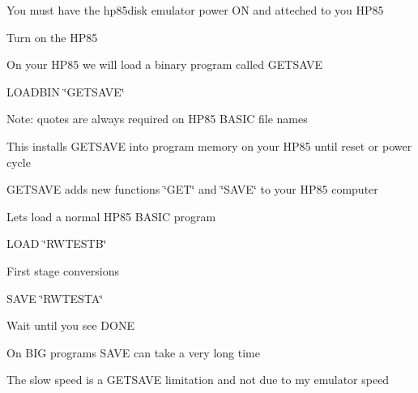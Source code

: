 \begin{DoxyItemize}
\item You must have the hp85disk emulator power ON and atteched to you H\+P85
\begin{DoxyItemize}
\item Turn on the H\+P85
\end{DoxyItemize}
\item On your H\+P85 we will load a binary program called G\+E\+T\+S\+A\+VE
\begin{DoxyItemize}
\item L\+O\+A\+D\+B\+IN \char`\"{}\+G\+E\+T\+S\+A\+V\+E\char`\"{}
\begin{DoxyItemize}
\item Note\+: quotes are always required on H\+P85 B\+A\+S\+IC file names
\item This installs G\+E\+T\+S\+A\+VE into program memory on your H\+P85 until reset or power cycle
\begin{DoxyItemize}
\item G\+E\+T\+S\+A\+VE adds new functions \char`\"{}\+G\+E\+T\char`\"{} and \char`\"{}\+S\+A\+V\+E\char`\"{} to your H\+P85 computer
\end{DoxyItemize}
\end{DoxyItemize}
\end{DoxyItemize}
\item Lets load a normal H\+P85 B\+A\+S\+IC program
\begin{DoxyItemize}
\item L\+O\+AD \char`\"{}\+R\+W\+T\+E\+S\+T\+B\char`\"{}
\end{DoxyItemize}
\item First stage conversions
\begin{DoxyItemize}
\item S\+A\+VE \char`\"{}\+R\+W\+T\+E\+S\+T\+A\char`\"{}
\begin{DoxyItemize}
\item Wait until you see D\+O\+NE
\begin{DoxyItemize}
\item On B\+IG programs S\+A\+VE can take a very long time
\begin{DoxyItemize}
\item The slow speed is a G\+E\+T\+S\+A\+VE limitation and not due to my emulator speed
\end{DoxyItemize}
\end{DoxyItemize}
\end{DoxyItemize}
\end{DoxyItemize}

\end{DoxyItemize}
